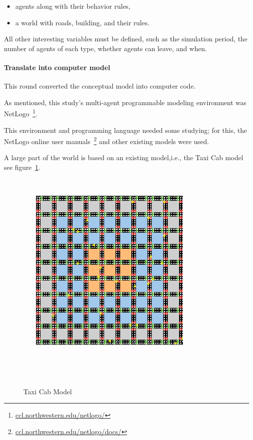 \begin{itemize}
\item agents along with their behavior rules,\\
\item a world with roads, building, and their rules.\\
\end{itemize}


All other interesting variables must be defined, such as the simulation period, the number of agents of each type, whether agents can leave, and when.



\paragraph{Translate into computer model}

This round converted the conceptual model into computer code.



As mentioned, this study's multi-agent programmable modeling environment was NetLogo~\footnote{\url{ccl.northwestern.edu/netlogo/}}.



This environment and programming language needed some studying; for this, the NetLogo online user manuals~\footnote{\url{ccl.northwestern.edu/netlogo/docs/}} and other existing models were used.



A large part of the world is based on an existing model,i.e., the Taxi Cab model~\cite{dongpingtaxicabs2019} see figure~\ref{fig:taxicabmodel}.



\begin{figure}

    \centering

    \includegraphics[width=8cm]{sections/pics/Taxi Cabs}

    \caption{Taxi Cab Model}

    \label{fig:taxicabmodel}

\end{figure}



